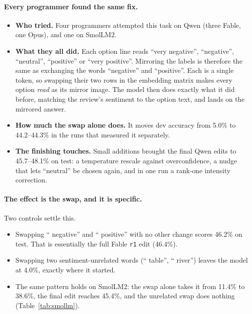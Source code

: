 \paragraph{Every programmer found the same fix.}
\begin{itemize}
  \item \textbf{Who tried.} Four programmers attempted this task on Qwen (three Fable, one Opus), and one on SmolLM2.
  \item \textbf{What they all did.} Each option line reads ``very negative'', ``negative'', ``neutral'', ``positive'' or ``very positive''. Mirroring the labels is therefore the same as exchanging the words ``negative'' and ``positive''. Each is a single token, so swapping their two rows in the embedding matrix makes every option \emph{read} as its mirror image. The model then does exactly what it did before, matching the review's sentiment to the option text, and lands on the mirrored answer.
  \item \textbf{How much the swap alone does.} It moves dev accuracy from 5.0\% to 44.2--44.3\% in the runs that measured it separately.
  \item \textbf{The finishing touches.} Small additions brought the final Qwen edits to 45.7--48.1\% on test: a temperature rescale against overconfidence, a nudge that lets ``neutral'' be chosen again, and in one run a rank-one intensity correction.
\end{itemize}

\paragraph{The effect is the swap, and it is specific.} Two controls settle this.
\begin{itemize}
  \item Swapping `` negative'' and `` positive'' with no other change scores 46.2\% on test. That is essentially the full Fable \texttt{r1} edit (46.4\%).
  \item Swapping two sentiment-unrelated words (`` table'', `` river'') leaves the model at 4.0\%, exactly where it started.
  \item The same pattern holds on SmolLM2: the swap alone takes it from 11.4\% to 38.6\%, the final edit reaches 45.4\%, and the unrelated swap does nothing (Table~\ref{tab:smollm}).
\end{itemize}

